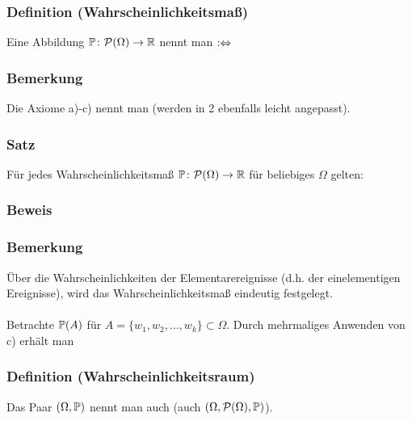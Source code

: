 \subsubsection{Definition (Wahrscheinlichkeitsma\ss{})}
Eine Abbildung $\mathbb{P}\colon\mathcal{P}(\Omega)\to\mathbb{R}$ nennt man  $:\Leftrightarrow$
\subsubsection{Bemerkung}
Die Axiome a)-c) nennt man  (werden in 2 ebenfalls leicht angepasst).
\subsubsection{Satz}
F\"ur jedes Wahrscheinlichkeitsma\ss{} $\mathbb{P}\colon\mathcal{P}(\Omega)\to\mathbb{R}$ f\"ur beliebiges $\Omega$ gelten:
\subsubsection{Beweis}
\weg
\subsubsection{Bemerkung}
\"Uber die Wahrscheinlichkeiten der Elementarereignisse (d.h. der einelementigen Ereignisse), wird das Wahrscheinlichkeitsma\ss{} eindeutig festgelegt.
\\~\\
Betrachte $\mathbb{P}(A)$ f\"ur $A=\{w_1,w_2,\ldots,w_k\}\subset\Omega$. Durch mehrmaliges Anwenden von c) erh\"alt man
\subsubsection{Definition (Wahrscheinlichkeitsraum)}
Das Paar $(\Omega,\mathbb{P})$ nennt man auch  (auch $(\Omega,\mathcal{P}(\Omega),\mathbb{P})$).
